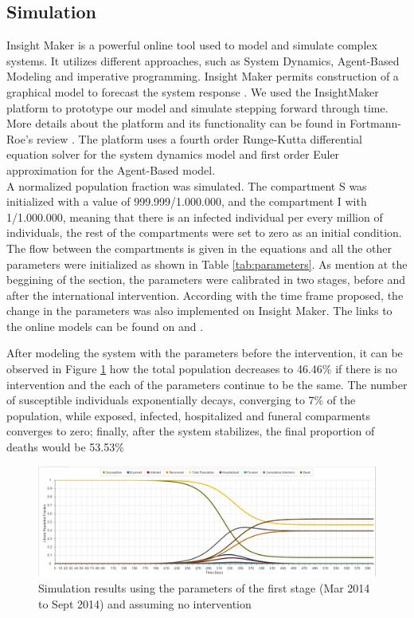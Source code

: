 \subsection{Simulation}
 Insight Maker is a powerful online tool used to model and simulate complex systems. It utilizes different approaches, such as System Dynamics, Agent-Based Modeling and imperative programming. Insight Maker permits  construction of a graphical model to forecast the system response \cite{FortmannRoe}. We used the InsightMaker platform to prototype our model and simulate stepping forward through time. More details about the platform and its functionality can be found in Fortmann-Roe's review \cite{FortmannRoe}. The platform uses a fourth order Runge-Kutta differential equation solver for the system dynamics model and  first order Euler approximation for the Agent-Based model.\\

\noindent A normalized population fraction was simulated. The compartment S was initialized with a value of 999.999/1.000.000, and the compartment I with 1/1.000.000, meaning that there is an infected individual per every million of individuals, the rest of the compartments were set to zero as an initial condition. The flow between the compartments is given in the equations and all the other parameters were initialized as shown in Table \ref{tab:parameters}.  As mention at the beggining of the section, the parameters were calibrated in two stages, before and after the international intervention. According with the time frame proposed, the change in the parameters was also implemented on Insight Maker. The links to the online models can be found on \cite{IM_AI} and  \cite{IM_BI}.  


%
\noindent After modeling the system with the parameters before the intervention, it can be observed in Figure \ref{fig:LB_IM_NoIn} how the total population decreases to 46.46\%  if there is no intervention and the each of the parameters continue to be the same. The number of susceptible individuals exponentially decays, converging to 7\% of the population, while exposed, infected, hospitalized and funeral comparments converges to zero; finally, after the system stabilizes, the final proportion of deaths would be 53.53\% 

\begin{figure}[!h]
  \centering
  \includegraphics[width=1\textwidth]{LB_NoInt_SD_IM}
  \caption{Simulation results using the parameters of the first stage (Mar 2014  to Sept 2014) and assuming no intervention}
\label{fig:LB_IM_NoIn} 
\end{figure}

